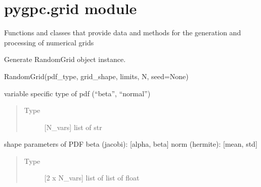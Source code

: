 \documentclass[letterpaper,10pt,english,openany,oneside]{sphinxmanual}
\begin{document}
\section{pygpc.grid module}
\label{\detokenize{pygpc:module-pygpc.grid}}\label{\detokenize{pygpc:pygpc-grid-module}}
Functions and classes that provide data and methods for the generation and processing of numerical grids

\begin{fulllineitems}
\label{\detokenize{pygpc:pygpc.grid.RandomGrid}}
Generate RandomGrid object instance.

RandomGrid(pdf\_type, grid\_shape, limits, N, seed=None)

\begin{fulllineitems}
\label{\detokenize{pygpc:pygpc.grid.RandomGrid.pdf_type}}
variable specific type of pdf (“beta”, “normal”)
\begin{quote}\begin{description}
\item[{Type}] \leavevmode
{[}N\_vars{]} list of str

\end{description}\end{quote}

\end{fulllineitems}


\begin{fulllineitems}
\label{\detokenize{pygpc:pygpc.grid.RandomGrid.grid_shape}}
shape parameters of PDF
beta (jacobi):  {[}alpha, beta{]}
norm (hermite): {[}mean, std{]}
\begin{quote}\begin{description}
\item[{Type}] \leavevmode
{[}2 x N\_vars{]} list of list of float

\end{description}\end{quote}

\end{fulllineitems}


\end{fulllineitems}
\end{document}
